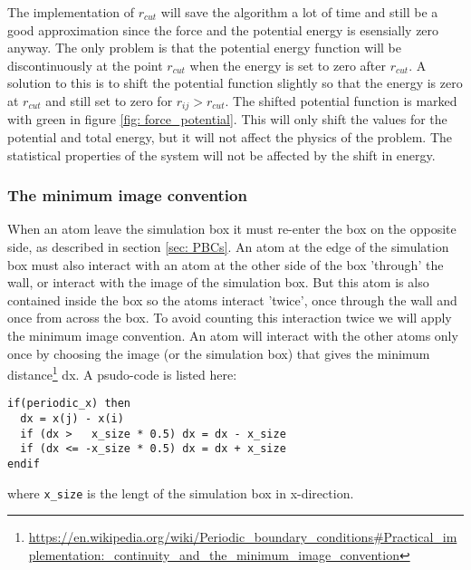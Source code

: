 \documentclass[11pt,a4wide]{article}
\begin{document}
The implementation of $r_{cut}$ will save the algorithm a lot of time and still be a good approximation since the force and the potential energy is esensially zero anyway. The only problem is that the potential energy function will be discontinuously at the point $r_{cut}$ when the energy is set to zero after $r_{cut}$. A solution to this is to shift the potential function slightly so that the energy is zero at $r_{cut}$ and still set to zero for $r_{ij}>r_{cut}$. The shifted potential function is marked with green in figure \ref{fig: force_potential}. This will only shift the values for the potential and total energy, but it will not affect the physics of the problem. The statistical properties of the system will not be affected by the shift in energy. 


\subsubsection*{The minimum image convention} 
When an atom leave the simulation box it must re-enter the box on the opposite side, as described in section \ref{sec: PBCs}. An atom at the edge of the simulation box must also interact with an atom at the other side of the box 'through' the wall, or interact with the image of the simulation box. But this atom is also contained inside the box so the atoms interact 'twice', once through the wall and once from across the box. To avoid counting this interaction twice we will apply the minimum image convention. An atom will interact with the other atoms only once by choosing the image (or the simulation box) that gives the minimum distance\footnote{\url{https://en.wikipedia.org/wiki/Periodic\_boundary\_conditions\#Practical\_implementation:\_continuity\_and\_the\_minimum\_image\_convention}} dx. A psudo-code is listed here:

\begin{lstlisting}
if(periodic_x) then
  dx = x(j) - x(i)
  if (dx >   x_size * 0.5) dx = dx - x_size
  if (dx <= -x_size * 0.5) dx = dx + x_size
endif
\end{lstlisting}
where \texttt{x\_size} is the lengt of the simulation box in x-direction.
\end{document}
